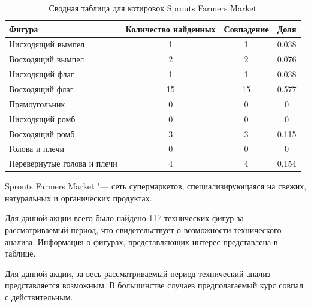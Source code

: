 \documentclass[bachelor, och, coursework]{SCWorks}
\begin{document}
        \begin{table}[!hbt]
            \centering
            \begin{tabular}{|l|c|c|c|}
            \hline
            Фигура                      & \multicolumn{1}{l|}{Количество найденных} & Совпадение & Доля  \\ \hline
            Нисходящий вымпел           & 1                                         & 1          & 0.038 \\ \hline
            Восходящий вымпел           & 2                                         & 2          & 0.076 \\ \hline
            Нисходящий флаг             & 1                                         & 1          & 0.038 \\ \hline
            Восходящий флаг             & 15                                        & 15         & 0.577 \\ \hline
            Прямоугольник               & 0                                         & 0          & 0     \\ \hline
            Нисходящий ромб             & 0                                         & 0          & 0     \\ \hline
            Восходящий ромб             & 3                                         & 3          & 0.115 \\ \hline
            Голова и плечи              & 0                                         & 0          & 0     \\ \hline
            Перевернутые голова и плечи & 4                                         & 4          & 0.154 \\ \hline
            \end{tabular}
            \captionsetup{justification=centering}
            \caption{Сводная таблица для котировок Sprouts Farmers Market}     
        \end{table}
    
        
            Sprouts Farmers Market "--- сеть супермаркетов, специализирующаяся 
            на свежих, натуральных и органических продуктах.
    
        
        Для данной акции всего было найдено 117 технических фигур за 
        рассматриваемый период, что свидетельствует о возможности технического 
        анализа. Информация о фигурах, представляющих интерес представлена в 
        таблице.
        
        Для данной акции, за весь рассматриваемый период технический анализ 
        представляется возможным. В большинстве случаев предполагаемый курс 
        совпал с действительным.
        
\end{document}
